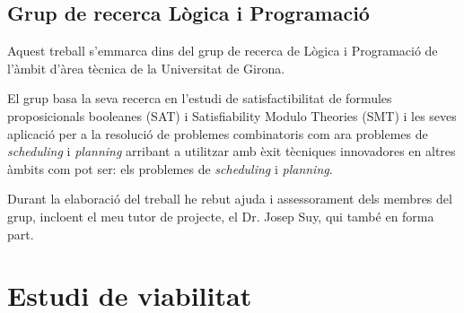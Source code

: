 \documentclass[11pt,a4paper,twoside]{report}
\begin{document}
  \section{Grup de recerca Lògica i Programació}
  Aquest treball s'emmarca dins del grup de recerca de Lògica i Programació de l'àmbit d'àrea tècnica de la Universitat de Girona.

  El grup basa la seva recerca en l'estudi de satisfactibilitat de formules proposicionals booleanes (SAT) i Satisfiability Modulo Theories (SMT) i les seves
  aplicació per a la resolució de problemes combinatoris com ara problemes de \textit{scheduling} i \textit{planning} arribant a utilitzar amb èxit tècniques innovadores en altres àmbits com
  pot ser: els problemes de \textit{scheduling} i \textit{planning}.

  Durant la elaboració del treball he rebut ajuda i assessorament dels membres del grup, incloent el meu tutor de projecte, el Dr. Josep Suy, qui també en forma part.

  \chapter{Estudi de viabilitat}
\end{document}
